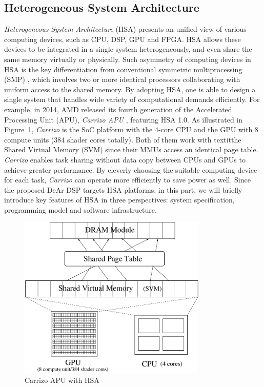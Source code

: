     \subsection{Heterogeneous System Architecture}
    \textit{Heterogeneous System Architecture} (HSA) presents an unified view of various computing devices, 
    such as CPU, DSP, GPU and FPGA.
    HSA allows these devices to be integrated in a single system heterogeneously, and even share the same memory virtually or physically.
    Such asymmetry of computing devices in HSA is the key differentiation from conventional symmetric multiprocessing (SMP) \cite{parallel},
    which involves two or more identical processors collaborating with uniform access to the shared memory.
    By adopting HSA, one is able to design a single system that handles wide variety of computational demands efficiently.
    For example, in 2014, AMD released its fourth generation of the Accelerated Processing Unit (APU), \textit{Carrizo APU} \cite{carrizo}, featuring HSA 1.0.
    As illustrated in Figure~\ref{fig:carrizo}, \textit{Carrizo} is the SoC platform with the 4-core CPU and the GPU with 8 compute units (384 shader cores totally).
    Both of them work with textit{the Shared Virtual Memory} (SVM) since their MMUs access an identical page table.
    \textit{Carrizo} enables task sharing without data copy between CPUs and GPUs to achieve greater performance.
    By cleverly choosing the suitable computing device for each task, 
    \textit{Carrizo} can operate more efficiently to save power as well.
    Since the proposed DeAr DSP targets HSA platforms, 
    in this part, we will briefly introduce key features of HSA in three perspectives: 
    system specification, programming model and software infrastructure.
        \vspace{\textfig}
        \begin{figure}[!ht] 
            \centering
            \includegraphics[width=0.8\textwidth]{./figs/carrizo.eps}
            \caption{Carrizo APU with HSA}
            \label{fig:carrizo}
        \end{figure}

